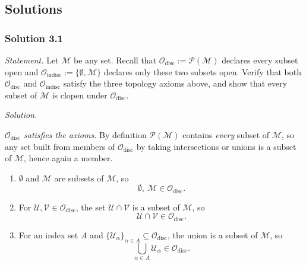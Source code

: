 \documentclass[11pt]{article}
\begin{document}
\subsection*{Solutions}

\subsubsection*{Solution 3.1}

\noindent\textit{Statement.} Let $\mathcal M$ be any set. Recall that $\mathcal O_{\mathrm{disc}}:=\mathcal P(\mathcal M)$ declares every subset open and $\mathcal O_{\mathrm{indisc}}:=\{\emptyset,\mathcal M\}$ declares only these two subsets open. Verify that both $\mathcal O_{\mathrm{disc}}$ and $\mathcal O_{\mathrm{indisc}}$ satisfy the three topology axioms above, and show that every subset of $\mathcal M$ is clopen under $\mathcal O_{\mathrm{disc}}$.

\medskip
\noindent\textit{Solution.}

\emph{$\mathcal O_{\mathrm{disc}}$ satisfies the axioms.} By definition $\mathcal P(\mathcal M)$ contains \emph{every} subset of $\mathcal M$, so any set built from members of $\mathcal O_{\mathrm{disc}}$ by taking intersections or unions is a subset of $\mathcal M$, hence again a member.
\begin{enumerate}[label=(\arabic*)]
  \item $\emptyset$ and $\mathcal M$ are subsets of $\mathcal M$, so
  \[
  \emptyset,\ \mathcal M\in\mathcal O_{\mathrm{disc}}.
  \]
  \item For $\mathcal U,\mathcal V\in\mathcal O_{\mathrm{disc}}$, the set $\mathcal U\cap\mathcal V$ is a subset of $\mathcal M$, so
  \[
  \mathcal U\cap\mathcal V\in\mathcal O_{\mathrm{disc}}.
  \]
  \item For an index set $A$ and $\{\mathcal U_\alpha\}_{\alpha\in A}\subseteq\mathcal O_{\mathrm{disc}}$, the union is a subset of $\mathcal M$, so
  \[
  \bigcup_{\alpha\in A}\mathcal U_\alpha\in\mathcal O_{\mathrm{disc}}.
  \]
\end{enumerate}
\end{document}
